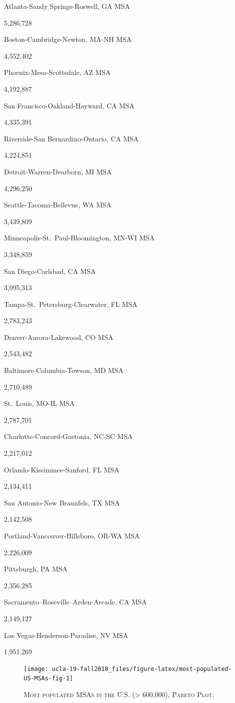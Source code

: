 \documentclass[]{book}
\theoremstyle{definition}
\theoremstyle{definition}
\theoremstyle{definition}
\theoremstyle{remark}
\begin{document}
Atlanta-Sandy Springs-Roswell, GA MSA

5,286,728

Boston-Cambridge-Newton, MA-NH MSA

4,552,402

Phoenix-Mesa-Scottsdale, AZ MSA

4,192,887

San Francisco-Oakland-Hayward, CA MSA

4,335,391

Riverside-San Bernardino-Ontario, CA MSA

4,224,851

Detroit-Warren-Dearborn, MI MSA

4,296,250

Seattle-Tacoma-Bellevue, WA MSA

3,439,809

Minneapolis-St.~Paul-Bloomington, MN-WI MSA

3,348,859

San Diego-Carlsbad, CA MSA

3,095,313

Tampa-St.~Petersburg-Clearwater, FL MSA

2,783,243

Denver-Aurora-Lakewood, CO MSA

2,543,482

Baltimore-Columbia-Towson, MD MSA

2,710,489

St.~Louis, MO-IL MSA

2,787,701

Charlotte-Concord-Gastonia, NC-SC MSA

2,217,012

Orlando-Kissimmee-Sanford, FL MSA

2,134,411

San Antonio-New Braunfels, TX MSA

2,142,508

Portland-Vancouver-Hillsboro, OR-WA MSA

2,226,009

Pittsburgh, PA MSA

2,356,285

Sacramento--Roseville--Arden-Arcade, CA MSA

2,149,127

Las Vegas-Henderson-Paradise, NV MSA

1,951,269

\begin{figure}

{\centering \texttt{[image: ucla-19-fall2018\_files/figure-latex/most-populated-US-MSAs-fig-1]} 

}

\caption{\textsc{Most populated MSAs in the U.S.
(\textgreater{} 600,000), Pareto Plot.}}\label{fig:most-populated-US-MSAs-fig}
\end{figure}
\end{document}
